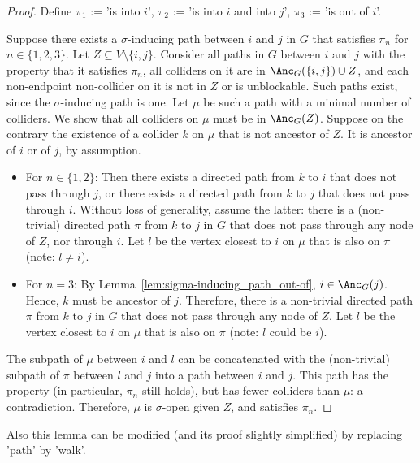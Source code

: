 \begin{proof}
  Define $\pi_1$ := 'is into $i$', $\pi_2$ := 'is into $i$ and into $j$', $\pi_3$ := 'is out of $i$'.

  Suppose there exists a $\sigma$-inducing path between $i$ and $j$ in $G$ that satisfies $\pi_n$ for $n \in \{1,2,3\}$.
  Let $Z \subseteq V\setminus\{i,j\}$. 
  Consider all paths in $G$ between $i$ and $j$ with the property that it satisfies $\pi_n$, all colliders on it are in $\Anc_{G}({\{i,j\}) \cup Z}$, and each non-endpoint non-collider on it is not in $Z$ or is unblockable.
  Such paths exist, since the $\sigma$-inducing path is one. 
  Let $\mu$ be such a path with a minimal number of colliders.
  We show that all colliders on $\mu$ must be in $\Anc_{G}(Z)$. 
  Suppose on the contrary the existence of a collider $k$ on $\mu$ that is not ancestor of $Z$. 
  It is ancestor of $i$ or of $j$, by assumption.

  \begin{itemize}
    \item For $n\in \{1,2\}$:
  Then there exists a directed path from $k$ to $i$ that does not pass through $j$, or there exists a directed path from $k$ to $j$ that does not pass through $i$.
  Without loss of generality, assume the latter:
  there is a (non-trivial) directed path $\pi$ from $k$ to $j$ in $G$ that does not pass through any node of $Z$, nor through $i$.
  Let $l$ be the vertex closest to $i$ on $\mu$ that is also on $\pi$ (note: $l \ne i$).
    \item For $n = 3$:
  By Lemma~\ref{lem:sigma-inducing_path_out-of}, $i \in \Anc_G(j)$.
  Hence, $k$ must be ancestor of $j$.
  Therefore, there is a non-trivial directed path $\pi$ from $k$ to $j$ in $G$ that does not pass through any node of $Z$.
  Let $l$ be the vertex closest to $i$ on $\mu$ that is also on $\pi$ (note: $l$ could be $i$).
  \end{itemize}

  The subpath of $\mu$ between $i$ and $l$ can be concatenated with the (non-trivial) subpath of $\pi$ between $l$ and $j$ into a path between $i$ and $j$.
  This path has the property (in particular, $\pi_n$ still holds), but has fewer colliders than $\mu$: a contradiction.
  Therefore, $\mu$ is $\sigma$-open given $Z$, and satisfies $\pi_n$.
\end{proof}
Also this lemma can be modified (and its proof slightly simplified) by replacing 'path' by 'walk'.

